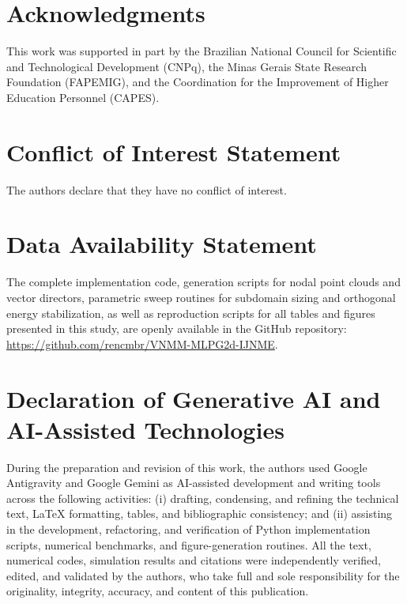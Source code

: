 \documentclass[VANCOUVER,Times1COL]{WileyNJD-v5}
\begin{document}
\section*{Acknowledgments}
This work was supported in part by the Brazilian National Council for Scientific and Technological Development (CNPq), the Minas Gerais State Research Foundation (FAPEMIG), and the Coordination for the Improvement of Higher Education Personnel (CAPES).

\section*{Conflict of Interest Statement}
The authors declare that they have no conflict of interest.

\section*{Data Availability Statement}
The complete implementation code, generation scripts for nodal point clouds and vector directors, parametric sweep routines for subdomain sizing and orthogonal energy stabilization, as well as reproduction scripts for all tables and figures presented in this study, are openly available in the GitHub repository: \url{https://github.com/rencmbr/VNMM-MLPG2d-IJNME}.

\section*{Declaration of Generative AI and AI-Assisted Technologies}
During the preparation and revision of this work, the authors used Google Antigravity and Google Gemini as AI-assisted development and writing tools across the following activities: (i) drafting, condensing, and refining the technical text, LaTeX formatting, tables, and bibliographic consistency; and (ii) assisting in the development, refactoring, and verification of Python implementation scripts, numerical benchmarks, and figure-generation routines. All the text, numerical codes, simulation results and citations were independently verified, edited, and validated by the authors, who take full and sole responsibility for the originality, integrity, accuracy, and content of this publication.


\end{document}
